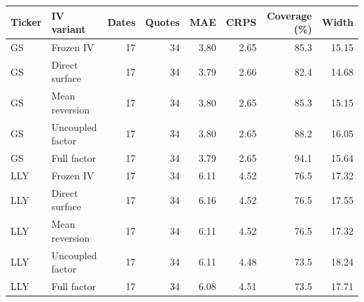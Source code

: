 \begin{tabular}{llrrrrrr}
\toprule
Ticker & IV variant & Dates & Quotes & MAE & CRPS & Coverage (\%) & Width \\
\midrule
GS & Frozen IV & 17 & 34 & 3.80 & 2.65 & 85.3 & 15.15 \\
GS & Direct surface & 17 & 34 & 3.79 & 2.66 & 82.4 & 14.68 \\
GS & Mean reversion & 17 & 34 & 3.80 & 2.65 & 85.3 & 15.15 \\
GS & Uncoupled factor & 17 & 34 & 3.80 & 2.65 & 88.2 & 16.05 \\
GS & Full factor & 17 & 34 & 3.79 & 2.65 & 94.1 & 15.64 \\
LLY & Frozen IV & 17 & 34 & 6.11 & 4.52 & 76.5 & 17.32 \\
LLY & Direct surface & 17 & 34 & 6.16 & 4.52 & 76.5 & 17.55 \\
LLY & Mean reversion & 17 & 34 & 6.11 & 4.52 & 76.5 & 17.32 \\
LLY & Uncoupled factor & 17 & 34 & 6.11 & 4.48 & 73.5 & 18.24 \\
LLY & Full factor & 17 & 34 & 6.08 & 4.51 & 73.5 & 17.71 \\
\bottomrule\end{tabular}
